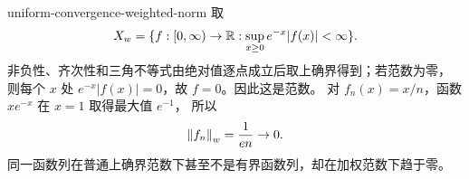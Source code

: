\begin{solution}{uniform-convergence-weighted-norm}
取
\[
 X_w=\{f:[0,\infty)\to\mathbb{R}:\sup_{x\ge0}e^{-x}|f(x)|<\infty\}.
\]
非负性、齐次性和三角不等式由绝对值逐点成立后取上确界得到；若范数为零，
则每个 \(x\) 处 \(e^{-x}|f(x)|=0\)，故 \(f=0\)。因此这是范数。
对 \(f_n(x)=x/n\)，函数 \(xe^{-x}\) 在 \(x=1\) 取得最大值 \(e^{-1}\)，
所以
\[
 \left\lVert f_n\right\rVert_w=\frac1{en}\to0.
\]
同一函数列在普通上确界范数下甚至不是有界函数列，却在加权范数下趋于零。
\end{solution}
